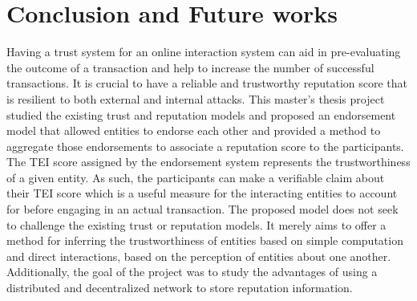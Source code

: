 \chapter{Conclusion and Future works} \label{ch:conclusion}
Having a trust system for an online interaction system can aid in
pre-evaluating the outcome of a transaction and help to increase the number of
successful transactions. It is crucial to have a reliable and trustworthy
reputation score that is resilient to both external and internal attacks. This
master's thesis project studied the existing trust and reputation models and
proposed an endorsement model that allowed entities to endorse each other and
provided a method to aggregate those endorsements to associate a reputation
score to the participants. The \ac{TEI} score assigned by the endorsement
system represents the trustworthiness of a given entity. As such, the
participants can make a verifiable claim about their \ac{TEI} score which is a
useful measure for the interacting entities to account for before engaging in
an actual transaction. The proposed model does not seek to challenge the
existing trust or reputation models. It merely aims to offer a method for
inferring the trustworthiness of entities based on simple computation and
direct interactions, based on the perception of entities about one another.
Additionally, the goal of the project was to study the advantages of using a
distributed and decentralized network to store reputation information.\par

